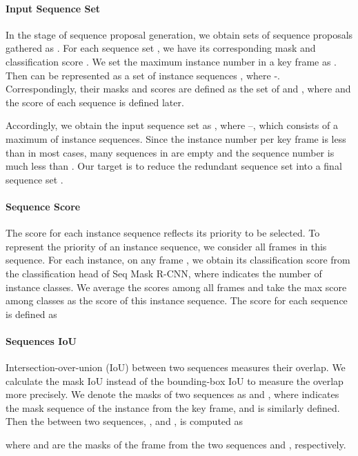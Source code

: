\documentclass[10pt,twocolumn,letterpaper]{article}
\begin{document}
	\vspace{-0.1in}
	\paragraph{Input Sequence Set}
	In the stage of sequence proposal generation, we obtain  sets of sequence proposals  gathered as . For each sequence set , we have its corresponding mask  and classification score . 
	We set the maximum instance number in a key frame as . Then  can be represented as a set of instance sequences , where -. Correspondingly, their masks and scores are defined as the set of  and ,
where  and the score of each sequence  is defined later.
	
	Accordingly, we obtain the input sequence set as , where --, which consists of a maximum of  instance sequences. Since the instance number per key frame is less than  in most cases, many sequences in  are empty and the sequence number is much less than . 
	Our target is to reduce the redundant sequence set  into a final sequence set .
	
	\vspace{-0.1in}
	\paragraph{Sequence Score}
	The score for each instance sequence  reflects its priority to be selected. 
	To represent the priority of an instance sequence, we consider all frames in this sequence. For each instance, on any frame , we obtain its classification score  from the classification head of Seq Mask R-CNN, where  indicates the number of instance classes. We average the scores among all frames and take the max score among  classes as the score of this instance sequence. The score for each sequence  is defined as 
	
	
	\vspace{-0.1in}
	\paragraph{Sequences IoU}
	Intersection-over-union (IoU) between two sequences measures their overlap. 
	We calculate the mask IoU instead of the bounding-box IoU to measure the overlap more precisely.
	We denote the masks of two sequences as  and , where  indicates the mask sequence of the  instance from the  key frame, and  is similarly defined.
Then the  between two sequences, \ie,  and , is computed as
	
	where  and  are the masks of the  frame from the two sequences  and , respectively.
	
\end{document}
